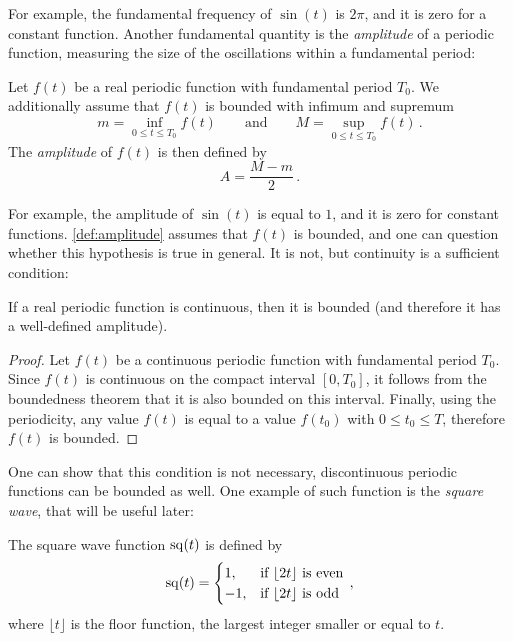 \noindent For example, the fundamental frequency of $\sin(t)$ is $2\pi$, and it is zero
for a constant function. Another fundamental quantity is the \emph{amplitude} of a
periodic function, measuring the size of the oscillations within a fundamental period:
\begin{definition}
  \label{def:amplitude}
  Let $f(t)$ be a real periodic function with fundamental period $T_0$. We additionally assume
  that $f(t)$ is bounded with infimum and supremum
  \begin{equation}
    m=\inf_{0\leq t\leq T_0}f(t)\qquad\text{and}\qquad M=\sup_{0\leq t\leq T_0}f(t)\,.
  \end{equation}
  The \emph{amplitude} of $f(t)$ is then defined by
  \begin{equation}
    A=\frac{M-m}{2}\,.
  \end{equation}
\end{definition}
\noindent For example, the amplitude of $\sin(t)$ is equal to $1$, and it is zero for
constant functions. \cref{def:amplitude} assumes that $f(t)$ is bounded, and one can
question whether this hypothesis is true in general. It is not, but continuity is a
sufficient condition:
\begin{proposition}
  If a real periodic function is continuous, then it is bounded (and therefore it has a
  well-defined amplitude).
\end{proposition}
\begin{proof}
  Let $f(t)$ be a continuous periodic function with fundamental period $T_0$. Since $f(t)$
  is continuous on the compact interval $[0,T_0]$, it follows from the boundedness theorem
  that it is also bounded on this interval. Finally, using the periodicity, any value
  $f(t)$ is equal to a value $f(t_0)$ with $0\leq t_0\leq T$, therefore $f(t)$ is bounded.
\end{proof}
\noindent One can show that this condition is not necessary, \ie discontinuous periodic
functions can be bounded as well. One example of such function is the \emph{square wave},
that will be useful later:
\begin{definition}
  \label{def:sq-wave}
  The square wave function $\mathrm{sq}(t)$ is defined by
  \begin{equation}
    \mathrm{sq}(t)=
    \begin{cases}
      1, &\text{if~}\lfloor 2t\rfloor~\text{is even}\\
      -1, &\text{if~}\lfloor 2t\rfloor~\text{is odd}\\
    \end{cases}\,,
  \end{equation}
  where $\lfloor t\rfloor$ is the floor function, \ie the largest integer smaller or equal
  to $t$.
\end{definition}
